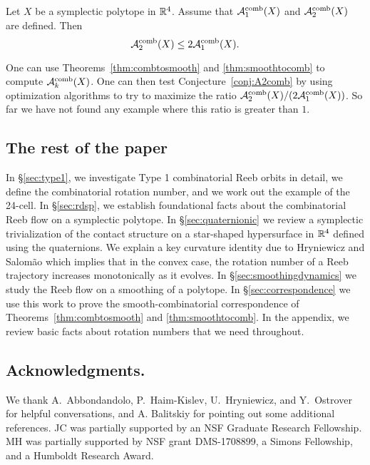\begin{conjecture}
\label{conj:A2comb}
Let $X$ be a symplectic polytope in ${\mathbb R}^4$. Assume that ${\mathcal A}_1^{\operatorname{comb}}(X)$ and ${\mathcal A}_2^{\operatorname{comb}}(X)$ are defined. Then
\[
{\mathcal A}_2^{\operatorname{comb}}(X) \le 2{\mathcal A}_1^{\operatorname{comb}}(X).
\]
\end{conjecture}

One can use Theorems~\ref{thm:combtosmooth} and \ref{thm:smoothtocomb} to compute ${\mathcal A}_k^{\operatorname{comb}}(X)$. One can then test Conjecture~\ref{conj:A2comb} by using optimization algorithms to try to maximize the ratio ${\mathcal A}_2^{\operatorname{comb}}(X)/(2{\mathcal A}_1^{\operatorname{comb}}(X))$. So far we have not found any example where this ratio is greater than $1$.

\subsection*{The rest of the paper}

In \S\ref{sec:type1}, we investigate Type 1 combinatorial Reeb orbits in detail, we define the combinatorial rotation number, and we work out the example of the 24-cell. In \S\ref{sec:rdsp}, we establish foundational facts about the combinatorial Reeb flow on a symplectic polytope. In \S\ref{sec:quaternionic} we review a symplectic trivialization of the contact structure on a star-shaped hypersurface in ${\mathbb R}^4$ defined using the quaternions. We explain a key curvature identity due to Hryniewicz and Salom\~ao which implies that in the convex case, the rotation number of a Reeb trajectory increases monotonically as it evolves. In \S\ref{sec:smoothingdynamics} we study the Reeb flow on a smoothing of a polytope. In \S\ref{sec:correspondence} we use this work to prove the smooth-combinatorial correspondence of Theorems~\ref{thm:combtosmooth} and \ref{thm:smoothtocomb}. In the appendix, we review basic facts about rotation numbers that we need throughout.

\subsection*{Acknowledgments.} We thank A.\ Abbondandolo, P.\ Haim-Kislev, U.\ Hryniewicz, and Y.\ Ostrover for helpful conversations, and A. Balitskiy for pointing out some additional references. JC was partially supported by an NSF Graduate Research Fellowship. MH was partially supported by NSF grant DMS-1708899, a Simons Fellowship, and a Humboldt Research Award.

